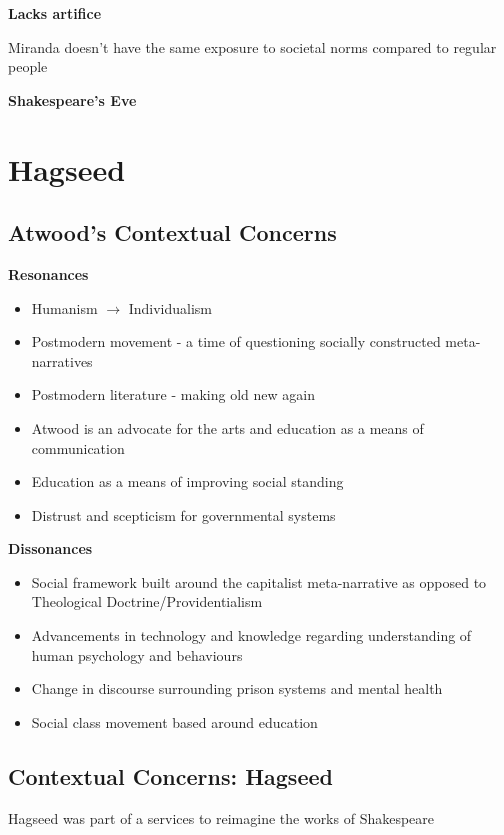 	\textbf{Lacks artifice}

		Miranda doesn't have the same exposure to societal norms compared to regular people

	\textbf{Shakespeare's Eve}

\section{Hagseed} \label{07/03/2025}

	\subsection{Atwood's Contextual Concerns}
	
		\textbf{Resonances}

		\begin{itemize}
			\item Humanism $\rightarrow$ Individualism
			\item Postmodern movement - a time of questioning socially constructed meta-narratives
			\item Postmodern literature - making old new again
			\item Atwood is an advocate for the arts and education as a means of communication
			\item Education as a means of improving social standing
			\item Distrust and scepticism for governmental systems
		\end{itemize}

		\textbf{Dissonances}

		\begin{itemize}
			\item Social framework built around the capitalist meta-narrative as opposed to Theological Doctrine/Providentialism
			\item Advancements in technology and knowledge regarding understanding of human psychology and behaviours
			\item Change in discourse surrounding prison systems and mental health
			\item Social class movement based around education
		\end{itemize}

	\subsection{Contextual Concerns: Hagseed}
	
		Hagseed was part of a services to reimagine the works of Shakespeare

